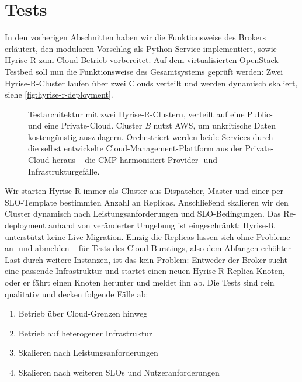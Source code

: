 \section{Tests}

In den vorherigen Abschnitten haben wir die Funktionsweise des Brokers erläutert, den modularen Vorschlag als Python-Service implementiert, sowie Hyrise-R zum Cloud-Betrieb vorbereitet. Auf dem virtualisierten OpenStack-Testbed soll nun die Funktionsweise des Gesamtsystems geprüft werden: Zwei Hyrise-R-Cluster laufen über zwei Clouds verteilt und werden dynamisch skaliert, siehe \autoref{fig:hyrise-r-deployment}.

\begin{figure}[ht]
	\centering
	\def\svgwidth{0.75\textwidth}
	{\footnotesize \textsf{
			}}
	\caption{Testarchitektur mit zwei Hyrise-R-Clustern, verteilt auf eine Public- und eine Private-Cloud. Cluster \emph{B} nutzt AWS, um unkritische Daten kostengünstig auszulagern. Orchestriert werden beide Services durch die selbst entwickelte Cloud-Management-Plattform aus der Private-Cloud heraus -- die CMP harmonisiert Provider- und Infrastrukturgefälle.}	
	\label{fig:hyrise-r-deployment}
\end{figure}

Wir starten Hyrise-R immer als Cluster aus Dispatcher, Master und einer per SLO-Template bestimmten Anzahl an Replicas. Anschließend skalieren wir den Cluster dynamisch nach Leistungsanforderungen und SLO-Bedingungen. Das Re-deployment anhand von veränderter Umgebung ist eingeschränkt: Hyrise-R unterstützt keine Live-Migration. Einzig die Replicas lassen sich ohne Probleme an- und abmelden -- für Tests des Cloud-Burstings, also dem Abfangen erhöhter Last durch weitere Instanzen, ist das kein Problem: Entweder der Broker sucht eine passende Infrastruktur und startet einen neuen Hyrise-R-Replica-Knoten, oder er fährt einen Knoten herunter und meldet ihn ab. Die Tests sind rein qualitativ und decken folgende Fälle ab:

\begin{enumerate}
	\item Betrieb über Cloud-Grenzen hinweg
	\item Betrieb auf heterogener Infrastruktur
	\item Skalieren nach Leistungsanforderungen
	\item Skalieren nach weiteren SLOs und Nutzeranforderungen
\end{enumerate}

